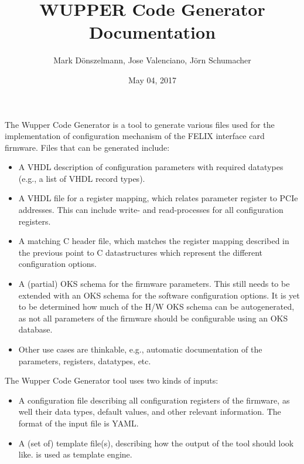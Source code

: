 \documentclass[letterpaper,10pt,english]{sphinxmanual}
\title{WUPPER Code Generator Documentation}
\date{May 04, 2017}
\author{Mark D\"onszelmann, Jose Valenciano, J\"orn Schumacher}
\begin{document}
\maketitle
\sphinxtableofcontents
{}\label{\detokenize{index::doc}}


The Wupper Code Generator is a tool to generate various files used for the
implementation of configuration mechanism of the FELIX interface card
firmware. Files that can be generated include:
\begin{itemize}
\item {} 
A VHDL description of configuration parameters with
required datatypes (e.g., a list of VHDL record types).

\item {} 
A VHDL file for a register mapping, which relates parameter
register to PCIe addresses. This can include write- and read-processes
for all configuration registers.

\item {} 
A matching C header file, which matches the register mapping described
in the previous point to C datastructures which represent the different
configuration options.

\item {} 
A (partial) OKS schema for the firmware parameters. This still needs to
be extended with an OKS schema for the software configuration options. It
is yet to be determined how much of the H/W OKS schema can be autogenerated,
as not all parameters of the firmware should be configurable using an OKS database.

\item {} 
Other use cases are thinkable, e.g., automatic documentation of the parameters,
registers, datatypes, etc.

\end{itemize}

The Wupper Code Generator tool uses two kinds of inputs:
\begin{itemize}
\item {} 
A configuration file describing all configuration registers of the firmware, as well
their data types, default values, and other relevant information.
The format of the input file is YAML.

\item {} 
A (set of) template file(s), describing how the output of the tool should
look like.  is used as template engine.

\end{itemize}
\end{document}

